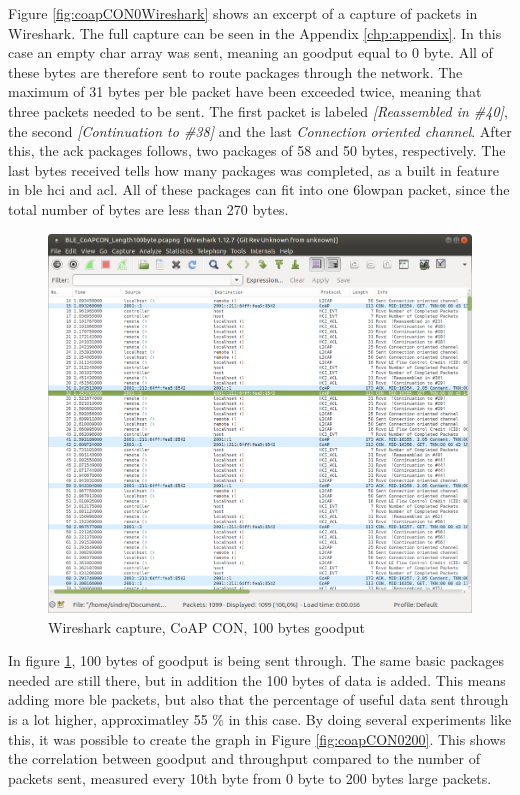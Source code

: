 Figure \ref{fig:coapCON0Wireshark} shows an excerpt of a capture of packets in Wireshark. The full capture can be seen in the Appendix \ref{chp:appendix}. In this case an empty char array was sent, meaning an goodput equal to 0 byte. All of these bytes are therefore sent to route packages through the network. The maximum of 31 bytes per \gls{ble} packet have been exceeded twice, meaning that three packets needed to be sent. The first packet is labeled \textit{[Reassembled in \#40]}, the second \textit{[Continuation to \#38]} and the last \textit{Connection oriented channel}. After this, the \gls{ack} packages follows, two packages of 58 and 50 bytes, respectively. The last bytes received tells how many packages was completed, as a built in feature in \gls{ble}  \gls{hci}  and \gls{acl}. All of these packages can fit into one \gls{6lowpan} packet, since the total number of bytes are less than 270 bytes. 


\begin{figure}[ht]
    \centering
    \includegraphics[width=\textwidth]{wiresharkCON100bytes.png}    
    \caption{Wireshark capture, CoAP CON, 100 bytes goodput}
    \label{fig:coapCON100Wireshark}
\end{figure}

In figure \ref{fig:coapCON100Wireshark}, 100 bytes of goodput is being sent through. The same basic packages needed are still there, but in addition the 100 bytes of data is added. This means adding more \gls{ble} packets, but also that the percentage of useful data sent through is a lot higher, approximatley 55 \% in this case. By doing several experiments like this, it was possible to create the graph in Figure \ref{fig:coapCON0200}. This shows the correlation between goodput and throughput compared to the number of packets sent, measured every 10th byte from 0 byte to 200 bytes large packets.


